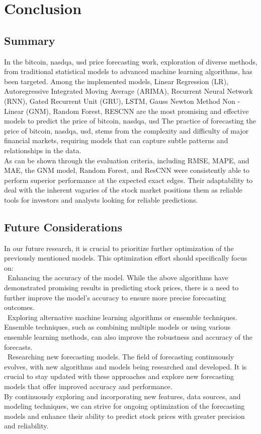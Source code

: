 \documentclass{ieeeojies}
\begin{document}
\section{Conclusion}
\subsection{Summary}
In the bitcoin, nasdqa, usd price forecasting work, exploration of diverse methods, from traditional statistical models to advanced machine learning algorithms, has been targeted. Among the implemented models, Linear Regression (LR), Autoregressive Integrated Moving Average (ARIMA), Recurrent Neural Network (RNN), Gated Recurrent Unit (GRU), LSTM, Gauss Newton Method Non -Linear (GNM), Random Forest, RESCNN are the most promising and effective models to predict the price of bitcoin, nasdqa, usd
The practice of forecasting the price of bitcoin, nasdqa, usd, stems from the complexity and difficulty of major financial markets, requiring models that can capture subtle patterns and relationships in the data.\\
As can be shown through the evaluation criteria, including RMSE, MAPE, and MAE, the GNM model, Random Forest, and ResCNN were consistently able to perform superior performance at the expected exact edges. Their adaptability to deal with the inherent vagaries of the stock market positions them as reliable tools for investors and analysts looking for reliable predictions.

\subsection{Future Considerations}
In our future research, it is crucial to prioritize further optimization of the previously mentioned models. This optimization effort should specifically focus on:\\
\indent\textbullet\ Enhancing the accuracy of the model. While the above algorithms have demonstrated promising results in predicting stock prices, there is a need to further improve the model's accuracy to ensure more precise forecasting outcomes.\\
\indent\textbullet\ Exploring alternative machine learning algorithms or ensemble techniques. Ensemble techniques, such as combining multiple models or using various ensemble learning methods, can also improve the robustness and accuracy of the forecasts.\\
\indent\textbullet\ Researching new forecasting models. The field of forecasting continuously evolves, with new algorithms and models being researched and developed. It is crucial to stay updated with these approaches and explore new forecasting models that offer improved accuracy and performance. \\
By continuously exploring and incorporating new features, data sources, and modeling techniques, we can strive for ongoing optimization of the forecasting models and enhance their ability to predict stock prices with greater precision and reliability.
\end{document}
